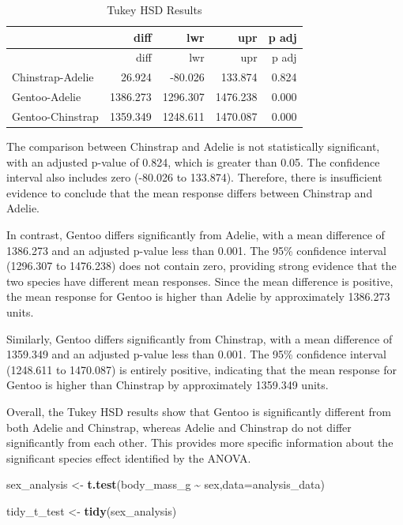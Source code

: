 \documentclass[
  11pt,
]{article}
\newenvironment{Shaded}{\begin{snugshade}}{\end{snugshade}}
\newcommand{\AttributeTok}[1]{\textcolor[rgb]{0.13,0.29,0.53}{#1}}
\newcommand{\FunctionTok}[1]{\textcolor[rgb]{0.13,0.29,0.53}{\textbf{#1}}}
\newcommand{\NormalTok}[1]{#1}
\newcommand{\OtherTok}[1]{\textcolor[rgb]{0.56,0.35,0.01}{#1}}
\newcommand{\SpecialCharTok}[1]{\textcolor[rgb]{0.81,0.36,0.00}{\textbf{#1}}}
\begin{document}
\begin{longtable}[]{@{}lrrrr@{}}
\caption{Tukey HSD Results}\tabularnewline
\toprule\noalign{}
& diff & lwr & upr & p adj \\
\midrule\noalign{}
\endfirsthead
\toprule\noalign{}
& diff & lwr & upr & p adj \\
\midrule\noalign{}
\endhead
\bottomrule\noalign{}
\endlastfoot
Chinstrap-Adelie & 26.924 & -80.026 & 133.874 & 0.824 \\
Gentoo-Adelie & 1386.273 & 1296.307 & 1476.238 & 0.000 \\
Gentoo-Chinstrap & 1359.349 & 1248.611 & 1470.087 & 0.000 \\
\end{longtable}

The comparison between Chinstrap and Adelie is not statistically
significant, with an adjusted p-value of 0.824, which is greater than
0.05. The confidence interval also includes zero (-80.026 to 133.874).
Therefore, there is insufficient evidence to conclude that the mean
response differs between Chinstrap and Adelie.

In contrast, Gentoo differs significantly from Adelie, with a mean
difference of 1386.273 and an adjusted p-value less than 0.001. The 95\%
confidence interval (1296.307 to 1476.238) does not contain zero,
providing strong evidence that the two species have different mean
responses. Since the mean difference is positive, the mean response for
Gentoo is higher than Adelie by approximately 1386.273 units.

Similarly, Gentoo differs significantly from Chinstrap, with a mean
difference of 1359.349 and an adjusted p-value less than 0.001. The 95\%
confidence interval (1248.611 to 1470.087) is entirely positive,
indicating that the mean response for Gentoo is higher than Chinstrap by
approximately 1359.349 units.

Overall, the Tukey HSD results show that Gentoo is significantly
different from both Adelie and Chinstrap, whereas Adelie and Chinstrap
do not differ significantly from each other. This provides more specific
information about the significant species effect identified by the
ANOVA.

\begin{Shaded}
\begin{Highlighting}[]
\NormalTok{sex\_analysis }\OtherTok{\textless{}{-}} \FunctionTok{t.test}\NormalTok{(body\_mass\_g }\SpecialCharTok{\textasciitilde{}}\NormalTok{ sex,}\AttributeTok{data=}\NormalTok{analysis\_data)}

\NormalTok{tidy\_t\_test }\OtherTok{\textless{}{-}} \FunctionTok{tidy}\NormalTok{(sex\_analysis)}
\end{Highlighting}
\end{Shaded}
\end{document}
